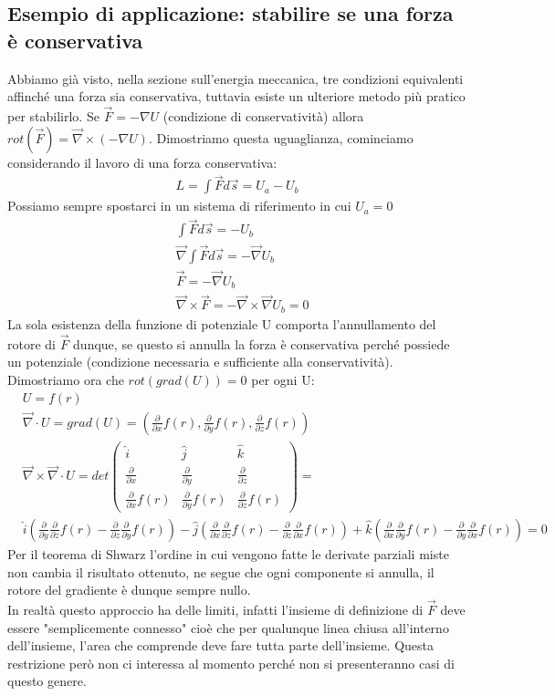 \documentclass[10pt,a4paper]{article}
\begin{document}
\subsection{Esempio di applicazione: stabilire se una forza è conservativa}
Abbiamo già visto, nella sezione sull'energia meccanica, tre condizioni equivalenti affinché una forza sia conservativa, tuttavia esiste un ulteriore metodo più pratico per stabilirlo.  Se $\vec{F} = -\nabla U$ (condizione di conservatività) allora $rot(\vec{F}) = \vec{\nabla}\times (-\nabla U)$. Dimostriamo questa uguaglianza, cominciamo considerando il lavoro di una forza conservativa:
\begin{align*}
	L = \int\vec{F}d\vec{s} = U_a-U_b
\end{align*}
Possiamo sempre spostarci in un sistema di riferimento in cui $U_a = 0$
\begin{align*}
	&\int\vec{F}d\vec{s} = -U_b\\
	&\vec{\nabla}\int\vec{F}d\vec{s} = -\vec{\nabla}U_b\\
	&\vec{F} = -\vec{\nabla}U_b\\
	&\vec{\nabla}\times \vec{F} = -\vec{\nabla}\times\vec{\nabla}U_b= 0
\end{align*}
La sola esistenza della funzione di potenziale U comporta l'annullamento del rotore di $\vec{F}$ dunque, se questo si annulla la forza è conservativa perché possiede un potenziale (condizione necessaria e sufficiente alla conservatività).\\
Dimostriamo ora che $rot(grad(U))=0$ per ogni U:
\begin{align*}
&U = f(r)\\
&\vec{\nabla}\cdot U= grad(U) = (\frac{\partial}{\partial x}f(r),\frac{\partial}{\partial y}f(r), \frac{\partial}{\partial z}f(r) )\\
&\vec{\nabla}\times \vec{\nabla}\cdot U = det
\begin{pmatrix}
	\hat{i}& \hat{j}&\hat{k}\\
	\frac{\partial}{\partial x}&\frac{\partial}{\partial y}&\frac{\partial}{\partial z}\\
	\frac{\partial}{\partial x}f(r)&\frac{\partial}{\partial y}f(r)& \frac{\partial}{\partial z}f(r) 
\end{pmatrix}
=\\
&\hat{i}(\frac{\partial}{\partial y}\frac{\partial}{\partial z}f(r) -\frac{\partial}{\partial z}\frac{\partial}{\partial y}f(r))-\hat{j}(\frac{\partial}{\partial x} \frac{\partial}{\partial z}f(r) -\frac{\partial}{\partial z}\frac{\partial}{\partial x}f(r))+\hat{k}(\frac{\partial}{\partial x}\frac{\partial}{\partial y}f(r)-\frac{\partial}{\partial y}\frac{\partial}{\partial x}f(r)) = 0
\end{align*}
Per il teorema di Shwarz l'ordine in cui vengono fatte le derivate parziali miste non cambia il risultato ottenuto, ne segue che ogni componente si annulla, il rotore del gradiente è dunque sempre nullo.\\
In realtà questo approccio ha delle limiti, infatti l'insieme di definizione di $\vec{F}$  deve essere "semplicemente connesso" cioè che per qualunque linea chiusa all'interno dell'insieme, l'area che comprende deve fare tutta parte dell'insieme. Questa restrizione però non ci interessa al momento perché non si presenteranno casi di questo genere.
\end{document}
